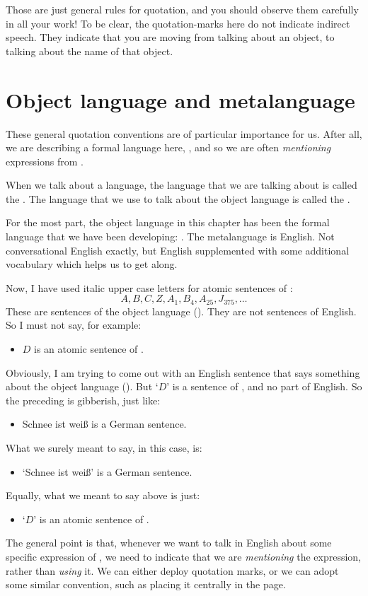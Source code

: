 Those are just general rules for quotation, and you should observe them carefully in all your work! To be clear, the quotation-marks here do not indicate indirect speech. They indicate that you are moving from talking about an object, to talking about the name of that object.


\section{Object language and metalanguage}
These general quotation conventions are of particular importance for us. After all, we are describing a formal language here, \TFL, and so we are often \emph{mentioning} expressions from \TFL. 

When we talk about a language, the language that we are talking about is called the . The language that we use to talk about the object language is called the .
\label{def.metalanguage}

For the most part, the object language in this chapter has been the formal language that we have been developing: \TFL. The metalanguage is English. Not conversational English exactly, but English supplemented with some additional vocabulary which helps us to get along.

Now, I have used italic upper case letters for atomic sentences of \TFL:
	$$A, B, C, Z, A_1, B_4, A_{25}, J_{375},…$$
These are sentences of the object language (\TFL). They are not sentences of English. So I must not say, for example:
	\begin{itemize}
		\item $D$ is an atomic sentence of \TFL.
	\end{itemize}
Obviously, I am trying to come out with an English sentence that says something about the object language (\TFL). But `$D$' is a sentence of \TFL, and no part of English. So the preceding is gibberish, just like:
	\begin{itemize}
		\item Schnee ist weiß is a German sentence.
	\end{itemize}
What we surely meant to say, in this case, is:
	\begin{itemize}
		\item `Schnee ist weiß' is a German sentence.
	\end{itemize}
Equally, what we meant to say above is just:
	\begin{itemize}
		\item `$D$' is an atomic sentence of \TFL.
	\end{itemize}
The general point is that, whenever we want to talk in English about some specific expression of \TFL, we need to indicate that we are \emph{mentioning} the expression, rather than \emph{using} it. We can either deploy quotation marks, or we can adopt some similar convention, such as  placing it centrally in the page. 


